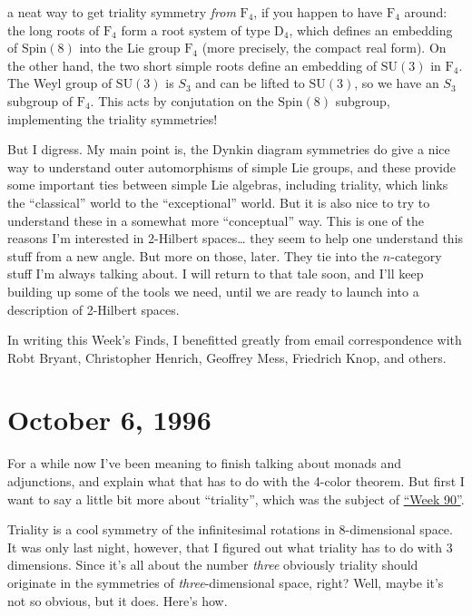 \documentclass{article}
\begin{document}
a neat way to get triality symmetry \emph{from} \(\mathrm{F}_4\), if you
happen to have \(\mathrm{F}_4\) around: the long roots of
\(\mathrm{F}_4\) form a root system of type \(\mathrm{D}_4\), which
defines an embedding of \(\mathrm{Spin}(8)\) into the Lie group
\(\mathrm{F}_4\) (more precisely, the compact real form). On the other
hand, the two short simple roots define an embedding of
\(\mathrm{SU}(3)\) in \(\mathrm{F}_4\). The Weyl group of
\(\mathrm{SU}(3)\) is \(S_3\) and can be lifted to \(\mathrm{SU}(3)\),
so we have an \(S_3\) subgroup of \(\mathrm{F}_4\). This acts by
conjutation on the \(\mathrm{Spin}(8)\) subgroup, implementing the
triality symmetries!

But I digress. My main point is, the Dynkin diagram symmetries do give a
nice way to understand outer automorphisms of simple Lie groups, and
these provide some important ties between simple Lie algebras, including
triality, which links the ``classical'' world to the ``exceptional''
world. But it is also nice to try to understand these in a somewhat more
``conceptual'' way. This is one of the reasons I'm interested in
2-Hilbert spaces\ldots{} they seem to help one understand this stuff
from a new angle. But more on those, later. They tie into the
\(n\)-category stuff I'm always talking about. I will return to that
tale soon, and I'll keep building up some of the tools we need, until we
are ready to launch into a description of 2-Hilbert spaces.

In writing this Week's Finds, I benefitted greatly from email
correspondence with Robt Bryant, Christopher Henrich, Geoffrey Mess,
Friedrich Knop, and others.
\hypertarget{week91}{%
\section{October 6, 1996}\label{week91}}

For a while now I've been meaning to finish talking about monads and
adjunctions, and explain what that has to do with the 4-color theorem.
But first I want to say a little bit more about ``triality'', which was
the subject of \protect\hyperlink{week90}{``Week 90''}.

Triality is a cool symmetry of the infinitesimal rotations in
8-dimensional space. It was only last night, however, that I figured out
what triality has to do with 3 dimensions. Since it's all about the
number \emph{three} obviously triality should originate in the
symmetries of \emph{three}-dimensional space, right? Well, maybe it's
not so obvious, but it does. Here's how.
\end{document}
